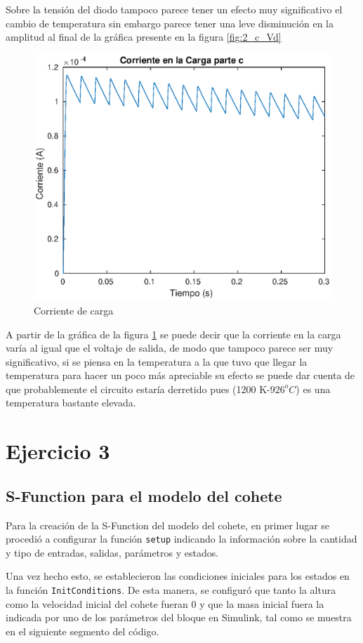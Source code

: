 \documentclass[12pt,letterpaper]{article}
\begin{document}
Sobre la tensión del diodo tampoco parece tener un efecto muy significativo el cambio de temperatura sin embargo parece tener una leve disminución en la amplitud al final de la gráfica presente en la figura \ref{fig:2_c_Vd}

\begin{figure}[ht!]
  \centering
  \includegraphics[width=0.8\linewidth]{pictures/Ejercicio2_c_carga.eps}
  \caption{Corriente de carga}
  \label{fig:2_c_carga}
\end{figure}

A partir de la gráfica de la figura \ref{fig:2_c_carga} se puede decir que la corriente en la carga varía al igual que el voltaje de salida, de modo que tampoco parece ser muy significativo, si se piensa en la temperatura a la que tuvo que llegar la temperatura para hacer un poco más apreciable su efecto se puede dar cuenta de que probablemente el circuito estaría derretido pues (1200 K-$926 ^o C$) es una temperatura bastante elevada.


\section{Ejercicio 3}

\subsection{S-Function para el modelo del cohete}
Para la creación de la S-Function del modelo del cohete, en primer lugar se procedió a configurar la
función \texttt{setup} indicando la información sobre la cantidad y tipo de entradas, salidas,
parámetros y estados.

Una vez hecho esto, se establecieron las condiciones iniciales para los estados en la función
\texttt{InitConditions}. De esta manera, se configuró que tanto la altura como la velocidad inicial
del cohete fueran 0 y que la masa inicial fuera la indicada por uno de los parámetros del bloque en
Simulink, tal como se muestra en el siguiente segmento del código.
\end{document}
